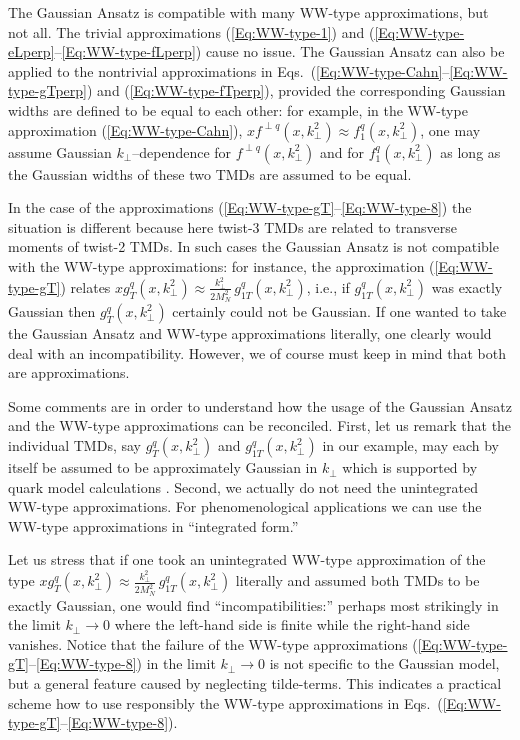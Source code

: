 \documentclass[a4paper,11pt]{article}
\def\kperp{k_\perp}
\begin{document}
The Gaussian Ansatz is compatible with many WW-type approximations,
but not all. The trivial approximations (\ref{Eq:WW-type-1}) and
(\ref{Eq:WW-type-eLperp}--\ref{Eq:WW-type-fLperp}) cause no issue.
The Gaussian Ansatz can also be applied to the nontrivial approximations
in Eqs.~(\ref{Eq:WW-type-Cahn}--\ref{Eq:WW-type-gTperp})
and (\ref{Eq:WW-type-fTperp}), provided the corresponding Gaussian
widths are defined to be equal to each other: for example, in the
WW-type approximation (\ref{Eq:WW-type-Cahn}),
$xf^{\perp q}(x,\kperp^2)\approx f_1^q(x,\kperp^2)$, one may
assume Gaussian $\kperp$--dependence for $f^{\perp q}(x,\kperp^2)$
and for $f_1^q(x,\kperp^2)$ as long as the Gaussian widths
of these two TMDs are assumed to be equal.

In the case of the approximations
(\ref{Eq:WW-type-gT}--\ref{Eq:WW-type-8})
the situation is different because here twist-3 TMDs
are related to transverse moments of twist-2 TMDs. In such cases the
Gaussian Ansatz is not compatible with the WW-type approximations:
for instance, the approximation (\ref{Eq:WW-type-gT}) relates
$xg_T^q(x,\kperp^2)\approx\frac{k_\perp^2}{2M_N^2}\,g_{1T}^{q}(x,\kperp^2)$,
i.e., if $g_{1T}^q(x,\kperp^2)$ was exactly Gaussian then
$g_T^q(x,\kperp^2)$ certainly could not be Gaussian. If one wanted to take
the Gaussian Ansatz and WW-type approximations literally, one clearly
would deal with an incompatibility. However, we of course must keep
in mind that both are approximations.

Some comments are in order to understand how the usage of the Gaussian
Ansatz and the WW-type approximations can be reconciled.
First, let us remark that the individual TMDs, say
$g_T^q(x,\kperp^2)$ and $g_{1T}^{q}(x,\kperp^2)$ in our example,
may each by itself be assumed to be approximately Gaussian in $k_\perp$
which is supported by quark model calculations \cite{Avakian:2010br}.
Second, we actually do not need the unintegrated WW-type approximations.
For phenomenological applications we can use the WW-type approximations
in ``integrated form.''

Let us stress that if one took an unintegrated WW-type approximation of the
type $xg_T^q(x,\kperp^2)\approx\frac{k_\perp^2}{2M_N^2}\,g_{1T}^{q}(x,\kperp^2)$
literally and assumed both TMDs to be exactly Gaussian, one would find
``incompatibilities:'' perhaps most strikingly in the limit $k_\perp\to 0$
where the left-hand side is finite while the right-hand side vanishes.
%
%
Notice that the failure of the WW-type approximations
(\ref{Eq:WW-type-gT}--\ref{Eq:WW-type-8}) in the limit $k_\perp\to 0$ is
not specific to the Gaussian model,
but a general feature caused by neglecting tilde-terms. This indicates
a practical scheme how to use responsibly the WW-type approximations in
Eqs.~(\ref{Eq:WW-type-gT}--\ref{Eq:WW-type-8}).
\end{document}
